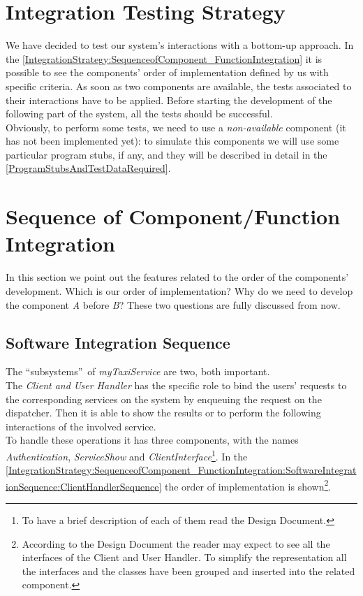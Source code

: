 \documentclass[\mainpath/main]{subfiles}
\begin{document}
\section{Integration Testing Strategy}
\label{IntegrationStrategy:IntegrationTestingStrategy}
We have decided to test our system's interactions with a bottom-up approach. In the \autoref{IntegrationStrategy:SequenceofComponent_FunctionIntegration} it is possible to see the components' order of implementation defined by us with specific criteria. As soon as two components are available, the tests associated to their interactions have to be applied. Before starting the development of the following part of the system, all the tests should be successful.\\ Obviously, to perform some tests, we need to use a \textit{non-available} component (it has not been implemented yet): to simulate this components we will use some particular program stubs, if any, and they will be described in detail in the \autoref{ProgramStubsAndTestDataRequired}.

\section{Sequence of Component/Function Integration}
\label{IntegrationStrategy:SequenceofComponent_FunctionIntegration}
In this section we point out the features related to the order of the components' development. Which is our order of implementation? Why do we need to develop the component \textit{A} before \textit{B}? These two questions are fully discussed from now.

\subsection{Software Integration Sequence}
\label{IntegrationStrategy:SequenceofComponent_FunctionIntegration:SoftwareIntegrationSequence}
The \textquotedblleft subsystems\textquotedblright\ of \textit{myTaxiService} are two, both important.\\
The \textit{Client and User Handler} has the specific role to bind the users' requests to the corresponding services on the system by enqueuing the request on the dispatcher. Then it is able to show the results or to perform the following interactions of the involved service.\\
To handle these operations it has three components, with the names \textit{Authentication}, \textit{ServiceShow} and \textit{ClientInterface}\footnote{To have a brief description of each of them read the Design Document.}. In the \autoref{IntegrationStrategy:SequenceofComponent_FunctionIntegration:SoftwareIntegrationSequence:ClientHandlerSequence} the order of implementation is shown\footnote{According to the Design Document the reader may expect to see all the interfaces of the Client and User Handler. To simplify the representation all the interfaces and the classes have been grouped and inserted into the related component.}.
\end{document}
